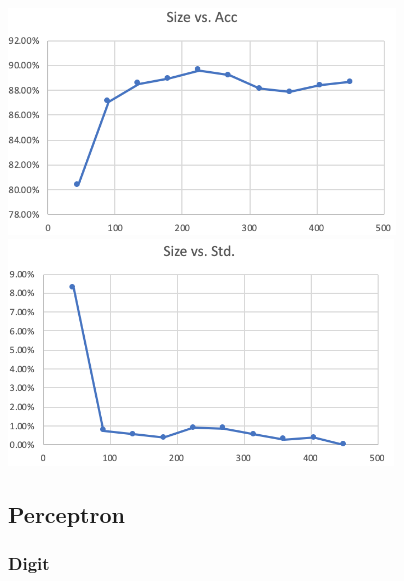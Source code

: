 \documentclass[12pt]{article}
\begin{document}
    \bigbreak
    \includegraphics[height=6cm]{bayes_acc_face}
    \bigbreak
    \includegraphics[height=6cm]{bayes_std_face}

\subsection{Perceptron}
\subsubsection{Digit}
\end{document}
